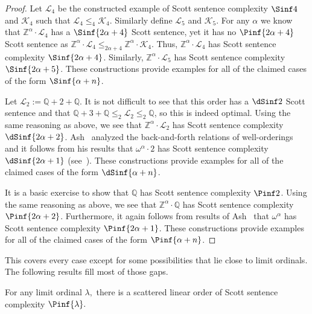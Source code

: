 \documentclass{amsart}
\newcommand{\Q}{\mathbb{Q}}
\newcommand{\Z}{\mathbb{Z}}
\newcommand{\K}{\mathcal{K}}
\renewcommand{\L}{\mathcal{L}}
\begin{document}
\begin{proof}
Let $\L_4$ be the constructed example of Scott sentence complexity $\Sinf4$ and $\K_4$ such that $\L_4\leq_4 \K_4$. 
Similarly define $\L_5$ and $\K_5$.
For any $\alpha$ we know that $\Z^\alpha\cdot \L_4$ has a $\Sinf{2\alpha+4}$
Scott sentence, yet it has no $\Pinf{2\alpha+4}$ Scott sentence as
$\Z^\alpha\cdot \L_4\leq_{2\alpha+4} \Z^\alpha\cdot \K_4$. Thus, $\Z^\alpha\cdot
\L_4$ has Scott sentence complexity $\Sinf{2\alpha+4}$. Similarly, $\Z^\alpha\cdot \L_5$ has Scott sentence complexity $\Sinf{2\alpha+5}$. These constructions provide examples for all of the claimed cases of the form $\Sinf{\alpha+n}$.

Let $\L_2:=\Q+2+\Q$. It is not difficult to see that this order has a $\dSinf2$
Scott sentence and that $\Q+3+\Q\leq_2 \L_2\leq_2 \Q$, so this is indeed
optimal. Using the same reasoning as above, we see that $\Z^\alpha\cdot \L_2$
has Scott sentence complexity $\dSinf{2\alpha+2}$. Ash~\cite{ash1986} analyzed
the back-and-forth relations of well-orderings and it follows from his results
that $\omega^\alpha\cdot 2$ has Scott sentence complexity $\dSinf{2\alpha+1}$
(see~\cite[proof of Proposition 19]{AR20}). These constructions provide examples
for all of the claimed cases of the form $\dSinf{\alpha+n}$.

It is a basic exercise to show that $\Q$ has Scott sentence complexity $\Pinf2$.
Using the same reasoning as above, we see that $\Z^\alpha\cdot \Q$ has Scott
sentence complexity $\Pinf{2\alpha+2}$. Furthermore, it again follows from
results of Ash~\cite{ash1986} that $\omega^\alpha$ has Scott sentence complexity
$\Pinf{2\alpha+1}$. These constructions provide examples for all of the claimed
cases of the form $\Pinf{\alpha+n}$. \end{proof}

This covers every case except for some possibilities that lie close to limit
ordinals. The following results fill most of those gaps.

\begin{proposition}\label{prop:scatteredlimit}
For any limit ordinal $\lambda,$ there is a scattered linear order of Scott sentence complexity $\Pinf{\lambda}.$
\end{proposition}
\end{document}
